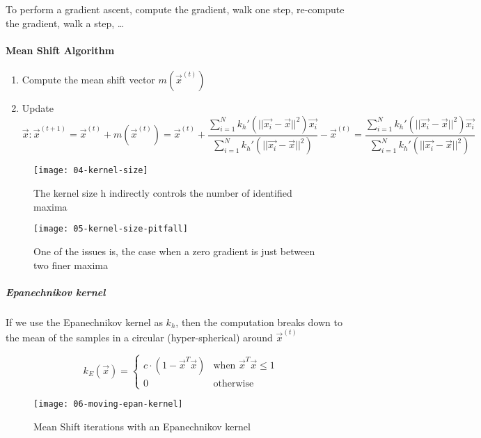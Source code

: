 To perform a gradient ascent, compute the gradient, walk one step, re-compute the gradient, walk a step, \ldots

\paragraph{Mean Shift Algorithm}
\begin{enumerate}
  \item Compute the mean shift vector $m(\vec{x}^{(t)})$
  \item Update $\vec{x}:\vec{x}^{(t+1)} = \vec{x}^{(t)} + m(\vec{x}^{(t)}) = \vec{x}^{(t)} + \dfrac{\sum_{i=1}^N k_h'(||\vec{x_i} - \vec{x}||^2) \vec{x_i}}{\sum_{i=1}^N k_h'(||\vec{x_i} - \vec{x}||^2)} - \vec{x}^{(t)}= \dfrac{\sum_{i=1}^N k_h'(||\vec{x_i} - \vec{x}||^2) \vec{x_i}}{\sum_{i=1}^N k_h'(||\vec{x_i} - \vec{x}||^2)}$
\end{enumerate}

\begin{figure}[H] 
	\centering
	\begin{minipage}[b]{0.4\textwidth}
		\texttt{[image: 04-kernel-size]}
		\caption{The kernel size h indirectly controls the number of identified maxima}
	\end{minipage}
	\begin{minipage}[b]{0.4\textwidth}
		\texttt{[image: 05-kernel-size-pitfall]}
		\caption{One of the issues is, the case when a zero gradient is just between two finer maxima}	
		\label{mean-shift-issue}	
	\end{minipage}
\end{figure}

\subparagraph{Epanechnikov kernel}
If we use the Epanechnikov kernel as $k_h$, then the computation breaks down to the mean of the samples in a circular (hyper-spherical) around $\vec{x}^{(t)}$

\begin{equation*}
  k_E(\vec{x}) = \begin{cases}
    c \cdot (1 - \vec{x}^T \vec{x})&\text{when } \vec{x}^T \vec{x} \le 1\\
    0 &\text{otherwise}
  \end{cases}
\end{equation*}

\begin{figure}[H]
  \centering
  \texttt{[image: 06-moving-epan-kernel]}
  \caption{Mean Shift iterations with an Epanechnikov kernel}
\end{figure}

